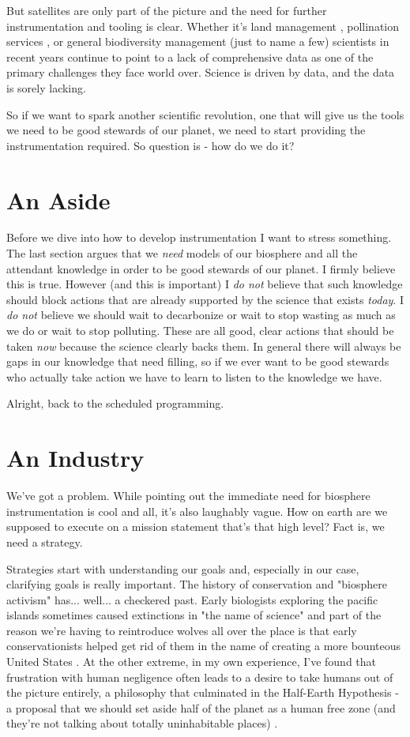 \documentclass[11pt,a5paper]{book}
\begin{document}
But satellites are only part of the picture and the need for further instrumentation and tooling is clear. Whether it's land management \cite{jpongratz}, pollination services \cite{ibartomeus}, or general biodiversity management \cite{hkuhl} (just to name a few) scientists in recent years continue to point to a lack of comprehensive data as one of the primary challenges they face world over. Science is driven by data, and the data is sorely lacking. 
\newline

So if we want to spark another scientific revolution, one that will give us the tools we need to be good stewards of our planet, we need to start providing the instrumentation required. So question is - how do we do it?

\section{An Aside}
Before we dive into how to develop instrumentation I want to stress something. The last section argues that we \textit{need} models of our biosphere and all the attendant knowledge in order to be good stewards of our planet. I firmly believe this is true. However (and this is important) I \textit{do not} believe that such knowledge should block actions that are already supported by the science that exists \textit{today}. I \textit{do not} believe we should wait to decarbonize or wait to stop wasting as much as we do or wait to stop polluting. These are all good, clear actions that should be taken \textit{now} because the science clearly backs them. In general there will always be gaps in our knowledge that need filling, so if we ever want to be good stewards who actually take action we have to learn to listen to the knowledge we have. 

Alright, back to the scheduled programming. 

\section{An Industry}
We've got a problem. While pointing out the immediate need for biosphere instrumentation is cool and all, it's also laughably vague. How on earth are we supposed to execute on a mission statement that's that high level? Fact is, we need a strategy. 

Strategies start with understanding our goals and, especially in our case, clarifying goals is really important. The history of conservation and "biosphere activism" has... well... a checkered past. Early biologists exploring the pacific islands sometimes caused extinctions in "the name of science" and part of the reason we're having to reintroduce wolves all over the place is that early conservationists helped get rid of them in the name of creating a more bounteous United States \cite{mnijhuis}. At the other extreme, in my own experience, I've found that frustration with human negligence often leads to a desire to take humans out of the picture entirely, a philosophy that culminated in the Half-Earth Hypothesis - a proposal that we should set aside half of the planet as a human free zone (and they're not talking about totally uninhabitable places) \cite{ewilson}. 
\end{document}
